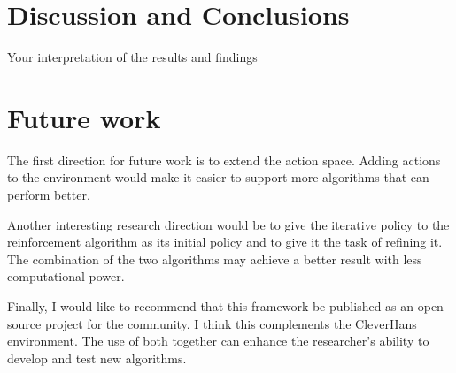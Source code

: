\documentclass{article}
\begin{document}
\section{Discussion and Conclusions}
Your interpretation of the results and findings


\section{Future work}
The first direction for future work is to extend the action space. Adding actions to the environment would make it easier to support more algorithms that can perform better.

Another interesting research direction would be to give the iterative policy to the reinforcement algorithm as its initial policy and to give it the task of refining it. The combination of the two algorithms may achieve a better result with less computational power.

Finally, I would like to recommend that this framework be published as an open source project for the community. I think this complements the CleverHans environment. The use of both together can enhance the researcher's ability to develop and test new algorithms.


  
 
\end{document}
